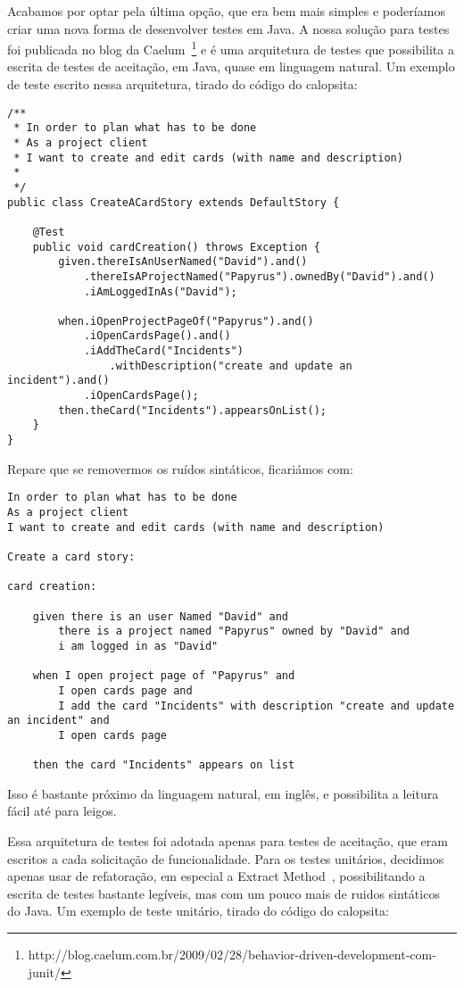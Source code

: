 Acabamos por optar pela última opção, que era bem mais simples e poderíamos criar uma nova forma de desenvolver 
testes em Java. A nossa solução para testes foi publicada no blog da Caelum~\footnote{http://blog.caelum.com.br/2009/02/28/behavior-driven-development-com-junit/} e é uma arquitetura de 
testes que possibilita a escrita de testes de aceitação, em Java, quase em linguagem natural. Um exemplo de teste 
escrito nessa arquitetura, tirado do código do calopsita:

\begin{lstlisting}
/**
 * In order to plan what has to be done
 * As a project client
 * I want to create and edit cards (with name and description)
 *
 */
public class CreateACardStory extends DefaultStory {

	@Test
	public void cardCreation() throws Exception {
		given.thereIsAnUserNamed("David").and()
			.thereIsAProjectNamed("Papyrus").ownedBy("David").and()
			.iAmLoggedInAs("David");

		when.iOpenProjectPageOf("Papyrus").and()
		    .iOpenCardsPage().and()
			.iAddTheCard("Incidents")
				.withDescription("create and update an incident").and()
			.iOpenCardsPage();
		then.theCard("Incidents").appearsOnList();
	}
}
\end{lstlisting}

Repare que se removermos os ruídos sintáticos, ficariámos com:

\begin{verbatim}
In order to plan what has to be done
As a project client
I want to create and edit cards (with name and description)

Create a card story:

card creation:
	
	given there is an user Named "David" and
		there is a project named "Papyrus" owned by "David" and
		i am logged in as "David"

	when I open project page of "Papyrus" and
		I open cards page and
		I add the card "Incidents" with description "create and update an incident" and
		I open cards page
			
	then the card "Incidents" appears on list
\end{verbatim}

Isso é bastante próximo da linguagem natural, em inglês, e possibilita a leitura fácil até para leigos.

Essa arquitetura de testes foi adotada apenas para testes de aceitação, que eram escritos a cada solicitação de
funcionalidade. Para os testes unitários, decidimos apenas usar de refatoração, em especial a Extract Method~\cite{refactoring}, possibilitando a escrita de testes bastante
legíveis, mas com um pouco mais de ruidos sintáticos do Java. Um exemplo de teste unitário, tirado do código do calopsita:

